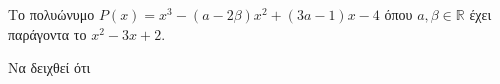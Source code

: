 Το πολυώνυμο $ P(x)=x^3-(a-2\beta)x^2+(3a-1)x-4 $ όπου $ a,\beta\in\mathbb{R} $ έχει παράγοντα το $ x^2-3x+2 $.
\begin{erwthma}
\item Να δειχθεί ότι 
\end{erwthma}
